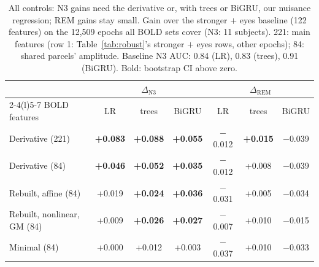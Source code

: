 \begin{table}[t]
\centering
\fontsize{7.5}{9}\selectfont
\setlength{\tabcolsep}{2.2pt}
\caption{All controls: N3 gains need the derivative or, with trees or BiGRU, our nuisance regression; REM gains stay small. Gain over the stronger $+$ eyes baseline (122 features) on the 12,509 epochs all BOLD sets cover (N3: 11 subjects). 221: main features (row 1: Table~\ref{tab:robust}'s stronger $+$ eyes rows, other epochs); 84: shared parcels' amplitude. Baseline N3 AUC: 0.84 (LR), 0.83 (trees), 0.91 (BiGRU). Bold: bootstrap CI above zero.}
\label{tab:allcontrols}
\begin{tabular}{@{}lcccccc@{}}
\toprule
 & \multicolumn{3}{c}{$\Delta_\mathrm{N3}$} & \multicolumn{3}{c}{$\Delta_\mathrm{REM}$} \\
\cmidrule(lr){2-4}\cmidrule(l){5-7}
BOLD features & LR & trees & BiGRU & LR & trees & BiGRU \\
\midrule
Derivative (221) & \textbf{+0.083} & \textbf{+0.088} & \textbf{+0.055} & $-$0.012 & \textbf{+0.015} & $-$0.039 \\
Derivative (84) & \textbf{+0.046} & \textbf{+0.052} & \textbf{+0.035} & $-$0.012 & +0.008 & $-$0.039 \\
Rebuilt, affine (84) & +0.019 & \textbf{+0.024} & \textbf{+0.036} & $-$0.031 & +0.005 & $-$0.034 \\
Rebuilt, nonlinear, GM (84) & +0.009 & \textbf{+0.026} & \textbf{+0.027} & $-$0.007 & +0.010 & $-$0.015 \\
Minimal (84) & +0.000 & +0.012 & +0.003 & $-$0.037 & +0.010 & $-$0.033 \\
\bottomrule
\end{tabular}
\end{table}
